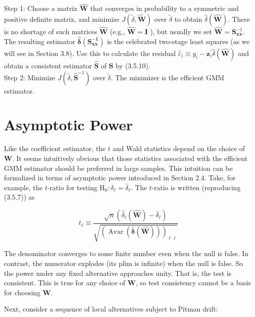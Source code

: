 \documentclass[10pt]{article}
\begin{document}
Step 1: Choose a matrix $\widehat{\mathbf{W}}$ that converges in probability to a symmetric and positive definite matrix, and minimize $J(\tilde{\delta}, \widehat{\mathbf{W}})$ over $\tilde{\delta}$ to obtain $\hat{\delta}(\widehat{\mathbf{W}})$. There is no shortage of such matrices $\widehat{\mathbf{W}}$ (e.g., $\widehat{\mathbf{W}}=\mathbf{I}$ ), but usually we set $\widehat{\mathbf{W}}=\mathbf{S}_{\mathbf{x x}}^{-1}$. The resulting estimator $\hat{\boldsymbol{\delta}}\left(\mathbf{S}_{\mathbf{x x}}^{-\mathbf{1}}\right)$ is the celebrated two-stage least squares (as we will see in Section 3.8). Use this to calculate the residual $\hat{\varepsilon}_{i} \equiv y_{i}-\mathbf{z}_{i}^{\prime} \hat{\delta}(\widehat{\mathbf{W}})$ and obtain a consistent estimator $\widehat{\mathbf{S}}$ of $\mathbf{S}$ by (3.5.10).\\
Step 2: Minimize $J\left(\tilde{\delta}, \widehat{\mathbf{S}}^{-1}\right)$ over $\tilde{\delta}$. The minimizer is the efficient GMM estimator.

\section*{Asymptotic Power}
Like the coefficient estimator, the $t$ and Wald statistics depend on the choice of $\mathbf{W}$. It seems intuitively obvious that those statistics associated with the efficient GMM estimator should be preferred in large samples. This intuition can be formalized in terms of asymptotic power introduced in Section 2.4. Take, for example, the $t$-ratio for testing $\mathrm{H}_{0}: \delta_{\ell}=\bar{\delta}_{\ell}$. The $t$-ratio is written (reproducing (3.5.7)) as


\begin{equation*}
t_{\ell} \equiv \frac{\sqrt{n}\left(\hat{\delta}_{\ell}(\widehat{\mathbf{W}})-\bar{\delta}_{\ell}\right)}{\sqrt{(\operatorname{Avar}(\widehat{\boldsymbol{\delta}}(\widehat{\mathbf{W}})))_{\ell \ell}}} \tag{3.5.17}
\end{equation*}


The denominator converges to some finite number even when the null is false. In contrast, the numerator explodes (its plim is infinite) when the null is false. So the power under any fixed alternative approaches unity. That is, the test is consistent. This is true for any choice of $\mathbf{W}$, so test consistency cannot be a basis for choosing $\mathbf{W}$.

Next, consider a sequence of local alternatives subject to Pitman drift:
\end{document}
